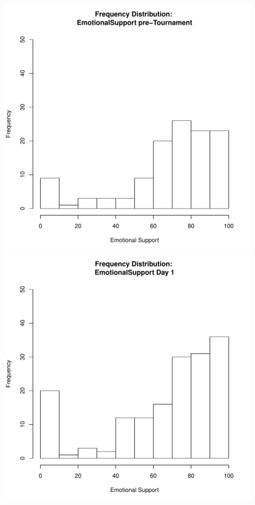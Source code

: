 \documentclass[12pt]{report}
\begin{document}
\clearpage
\includegraphics[scale =.4]{../images/distEmotionalSupportPre.pdf}
\includegraphics[scale =.4]{../images/distEmotionalSupportDay1.pdf}
\end{document}
